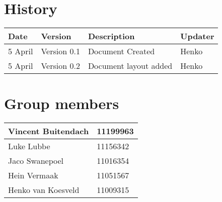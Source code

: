 
\section{History}

\begin{center}

\begin{tabular}{|l|l|l|l|}

\hline
Date & Version & Description&Updater\\ 
\hline
5 April& Version 0.1 & Document Created&Henko\\ 
\hline
5 April& Version 0.2 & Document layout added&Henko\\ 
\hline

\end{tabular}

\vfill
\section{Group members}

\begin{tabular}{|l|l|}

\hline
Vincent Buitendach & 11199963\\
\hline
Luke Lubbe & 11156342\\
\hline
Jaco Swanepoel & 11016354\\
\hline
Hein Vermaak & 11051567\\
\hline
Henko van Koesveld & 11009315\\
\hline

\end{tabular}

\end{center}

